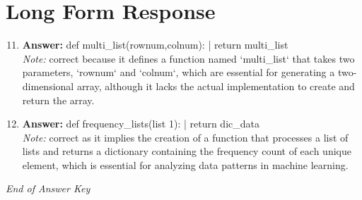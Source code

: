 \documentclass[12pt]{article}
\begin{document}
\section*{Long Form Response}
\begin{enumerate}[label=\arabic*.]
\setcounter{enumi}{10}
\item \textbf{Answer:} def multi\_list(rownum,colnum): | return multi\_list
\\ \textit{Note:} correct because it defines a function named `multi\_list` that takes two parameters, `rownum` and `colnum`, which are essential for generating a two-dimensional array, although it lacks the actual implementation to create and return the array.
\item \textbf{Answer:} def frequency\_lists(list 1): | return dic\_data
\\ \textit{Note:} correct as it implies the creation of a function that processes a list of lists and returns a dictionary containing the frequency count of each unique element, which is essential for analyzing data patterns in machine learning.
\end{enumerate}

\vfill
\noindent\textit{End of Answer Key}
\end{document}
